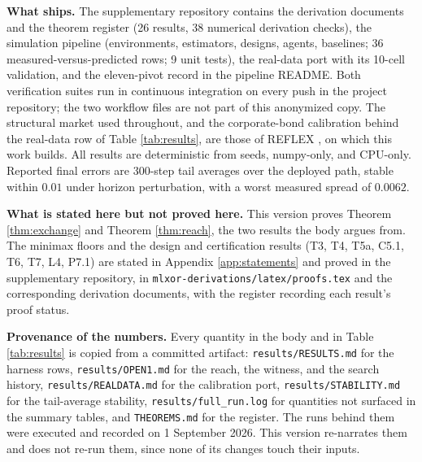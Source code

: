 \documentclass{article}
\begin{document}
\textbf{What ships.} The supplementary repository contains the derivation
documents and the theorem register (26 results, 38 numerical derivation
checks), the simulation pipeline (environments, estimators, designs, agents,
baselines; 36 measured-versus-predicted rows; 9 unit tests), the real-data
port with its 10-cell validation, and the eleven-pivot record in the pipeline
README. Both verification suites run in continuous integration on every push
in the project repository; the two workflow files are not part of this
anonymized copy. The structural market used throughout, and the corporate-bond
calibration behind the real-data row of Table \ref{tab:results}, are those of REFLEX
\citep{reflex2026}, on which this work builds. All results are deterministic from seeds, numpy-only, and CPU-only.
Reported final errors are 300-step tail averages over the deployed path,
stable within $0.01$ under horizon perturbation, with a worst measured spread
of $0.0062$.

\textbf{What is stated here but not proved here.} This version proves
Theorem \ref{thm:exchange} and Theorem \ref{thm:reach}, the two results the
body argues from. The minimax floors and the design and certification
results (T3, T4, T5a, C5.1, T6, T7, L4, P7.1) are stated in Appendix
\ref{app:statements} and proved in the supplementary repository, in
\texttt{mlxor-derivations/latex/proofs.tex} and the corresponding derivation
documents, with the register recording each result's proof status.

\textbf{Provenance of the numbers.} Every quantity in the body and in Table
\ref{tab:results} is copied from a committed artifact:
\texttt{results/RESULTS.md} for the harness rows, \texttt{results/OPEN1.md}
for the reach, the witness, and the search history,
\texttt{results/REALDATA.md} for the calibration port,
\texttt{results/STABILITY.md} for the tail-average stability,
\texttt{results/full\_run.log} for quantities not surfaced in the summary
tables, and \texttt{THEOREMS.md} for the register. The runs behind them were
executed and recorded on 1 September 2026. This version re-narrates them and
does not re-run them, since none of its changes touch their inputs.
\end{document}
